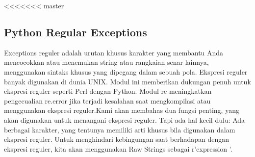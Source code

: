 <<<<<<< master
\subsection {Python Regular Exceptions}
 Exceptions reguler adalah urutan khusus karakter yang membantu Anda mencocokkan atau menemukan string atau rangkaian senar lainnya, menggunakan sintaks khusus yang dipegang dalam sebuah pola. Ekspresi reguler banyak digunakan di dunia UNIX. Modul ini memberikan dukungan penuh untuk ekspresi reguler seperti Perl dengan Python. Modul re meningkatkan pengecualian re.error jika terjadi kesalahan saat mengkompilasi atau menggunakan ekspresi reguler.Kami akan membahas dua fungsi penting, yang akan digunakan untuk menangani ekspresi reguler. Tapi ada hal kecil dulu: Ada berbagai karakter, yang tentunya memiliki arti khusus bila digunakan dalam ekspresi reguler. Untuk menghindari kebingungan saat berhadapan dengan ekspresi reguler, kita akan menggunakan Raw Strings sebagai r'expression '.
